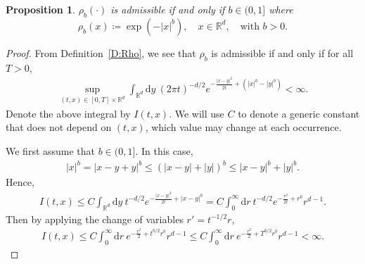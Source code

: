 \documentclass[sn-mathphys]{sn-jnl}%
\renewcommand{\R}{\mathbb{R}}
\newcommand{\ud}{\ensuremath{\mathrm{d}}}
\numberwithin{equation}{section}
\theoremstyle{thmstyleone}%
\newtheorem{proposition}[theorem]{Proposition}%
\theoremstyle{thmstyletwo}%
\theoremstyle{thmstylethree}%
\begin{document}
\begin{proposition}\label{P:adm}
  $\rho_b(\cdot)$ is admissible if and only if $b\in (0,1]$ where
	\begin{equation*}
	\rho_b(x) \coloneqq \exp\left(-\lvert x \rvert^b\right), \quad x\in\R^d,
	\quad \text{with $b>0$.}
	\end{equation*}
\end{proposition}
\begin{proof}
  From Definition~\ref{D:Rho}, we see that $\rho_b$ is admissible if and only if for all $T>0$,
	\begin{align*}
	\sup_{(t,x)\in[0,T]\times\R^d} \int_{\R^d} \ud y\: \left(2\pi t\right)^{-d/2} e^{-\frac{\lvert x-y \rvert^2}{2t} + (\lvert x \rvert^b - \lvert y \rvert^b)} <\infty.
	\end{align*}
  Denote the above integral by $I(t,x)$. We will use $C$ to denote a generic constant that does not
  depend on $(t,x)$, which value may change at each occurrence.

	We first assume that $b\in (0,1]$. In this case,
	\begin{align*}
    \lvert  x  \rvert ^b
    = \lvert  x-y +y  \rvert ^b
    \le \left(\lvert x-y \rvert + \lvert y \rvert\right)^b
    \le \lvert x-y \rvert^b + \lvert y \rvert^b.
	\end{align*}
	Hence,
	\begin{align*}
    I(t,x)
    \le C \int_{\R^d} \ud y\: t^{-d/2} e^{-\frac{\lvert x-y \rvert^2}{2t} + \lvert x-y \rvert^b}
    = C \int_0^\infty \ud r\: t^{-d/2} e^{-\frac{r^2}{2t} + r^b} r^{d-1}.
	\end{align*}
	Then by applying the change of variables $r' = t^{-1/2}r$,
	\begin{align*}
    I(t,x)
    \le C \int_0^\infty \ud r\: e^{-\frac{r^2}{2} + t^{b/2} r^b} r^{d-1}
    \le C \int_0^\infty \ud r\: e^{-\frac{r^2}{2} + T^{b/2} r^b} r^{d-1}
    < \infty.
	\end{align*}


\end{proof}
\end{document}

